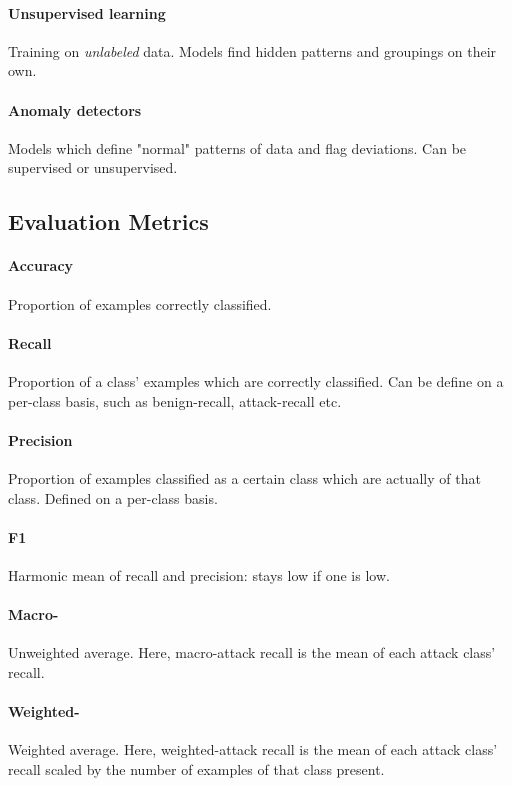 \documentclass{article}
\begin{document}
\begin{appendices}
\paragraph{Unsupervised learning} Training on \textit{unlabeled} data. Models find hidden patterns and groupings on their own.
\paragraph{Anomaly detectors} Models which define "normal" patterns of data and flag deviations. Can be supervised or unsupervised.
\subsection{Evaluation Metrics}
\paragraph{Accuracy} Proportion of examples correctly classified.
\paragraph{Recall} Proportion of a class' examples which are correctly classified. Can be define on a per-class basis, such as benign-recall, attack-recall etc.
\paragraph{Precision} Proportion of examples classified as a certain class which are actually of that class. Defined on a per-class basis.
\paragraph{F1} Harmonic mean of recall and precision: stays low if one is low.
\paragraph{Macro-} Unweighted average. Here, macro-attack recall is the mean of each attack class' recall.
\paragraph{Weighted-} Weighted average. Here, weighted-attack recall is the mean of each attack class' recall scaled by the number of examples of that class present.

\end{appendices}
\end{document}
